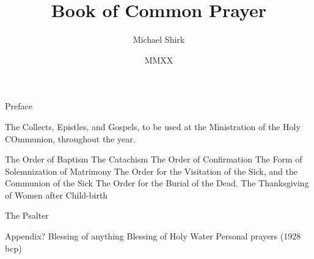 \documentclass[foolscapvopaper,12pt,twoside,openany,extrafontsizes,final]{memoir}
\begin{document}
\frontmatter
\title{Book of Common Prayer}
\author{Michael Shirk}
\date{MMXX}

\tableofcontents*


Preface


\mainmatter


\mainmatter




The Collects, Epistles, and Gospels, to be used at the Ministration of the Holy COmmunion, throughout the year.

% 

The Order of Baptism
The Catachism
The Order of Confirmation
The Form of Solemnization of Matrimony
The Order for the Visitation of the Sick, and the Communion of the Sick
The Order for the Burial of the Dead.
The Thanksgiving of Women after Child-birth

The Psalter

Appendix?
Blessing of anything
Blessing of Holy Water
Personal prayers (1928 bcp)
\end{document}
